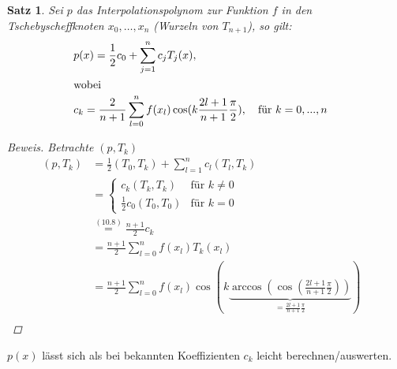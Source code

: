 \documentclass[12pt]{article}
\theoremstyle{break}
\newtheorem{theorem}{Satz}[subsection]
\begin{document}
\begin{theorem}
Sei $p$ das Interpolationspolynom zur Funktion $f$ in den Tschebyscheffknoten $x_0, \dots, x_n$ (Wurzeln von $T_{n+1}$), so gilt:
\begin{align*}
&p(x) = \frac{1}{2} c_0 + \sum_{j=1}^n c_j T_j(x), &\\
\intertext{wobei}
&c_k = \frac{2}{n+1} \sum_{l=0}^n f(x_l) \cos(k \frac{2l+1}{n+1}\frac{\pi}{2}), \quad \text{für $k=0,...,n$}
\end{align*}

\begin{proof}[Beweis]
Betrachte $(p, T_k)$
\begin{align*}
(p, T_k) &= \frac{1}{2} (T_0, T_k) + \sum_{l=1}^n c_l (T_l, T_k) &\\
&= \begin{cases}
c_k (T_k, T_k) & \text{für }k \neq 0 \\
\frac{1}{2} c_0 (T_0, T_0)  & \text{für }k = 0 
\end{cases}&\\
&\overset{(10.8)}{=} \frac{n+1}{2} c_k&\\
&= \frac{n+1}{2} \sum_{l=0}^n f(x_l) T_k(x_l) &\\
&= \frac{n+1}{2} \sum_{l=0}^n f(x_l) \cos\left(k \underbrace{\arccos\left(\cos\left(\frac{2l+1}{n+1}\frac{\pi}{2}\right)\right)}_{ = \frac{2l+1}{n+1}\frac{\pi}{2}}\right) &\\
\end{align*}
\end{proof}
\end{theorem}
$p(x)$ lässt sich als bei bekannten Koeffizienten $c_k$ leicht berechnen/auswerten.
\end{document}
